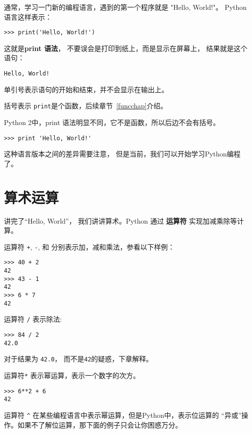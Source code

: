 \documentclass[10pt]{book}
\begin{document}
通常，学习一门新的编程语言，遇到的第一个程序就是 "Hello, World!"。
Python语言这样表示：

\begin{verbatim}
>>> print('Hello, World!')
\end{verbatim}
%

这就是{\bf print 语法}， 不要误会是打印到纸上，而是显示在屏幕上，
结果就是这个语句：

\begin{verbatim}
Hello, World!
\end{verbatim}
%

单引号表示语句的开始和结束，并不会显示在输出上。

括号表示 {\tt print}是个函数，后续章节~\ref{funcchap}介绍。
 

Python 2中，print 语法明显不同，它不是函数，所以后边不会有括号。

\begin{verbatim}
>>> print 'Hello, World!'
\end{verbatim}
%
这种语言版本之间的差异需要注意，
但是当前，我们可以开始学习Python编程了。


\section{算术运算}

讲完了“Hello, World”， 我们讲讲算术。Python 通过 {\bf 运算符} 
实现加减乘除等计算。

运算符 {\tt +}, {\tt -}, 和 {\tt *} 分别表示加，减和乘法，参看以下样例：

\begin{verbatim}
>>> 40 + 2
42
>>> 43 - 1
42
>>> 6 * 7
42
\end{verbatim}
%
运算符 {\tt /} 表示除法:

\begin{verbatim}
>>> 84 / 2
42.0
\end{verbatim}
%

对于结果为 {\tt 42.0}， 而不是{\tt 42}的疑惑，下章解释。

运算符{\tt **} 表示幂运算，表示一个数字的次方。

\begin{verbatim}
>>> 6**2 + 6
42
\end{verbatim}
%

运算符 \verb"^"  在某些编程语言中表示幂运算，但是Python中，表示位运算的
“异或”操作。如果不了解位运算，那下面的例子只会让你困惑万分。
\end{document}
